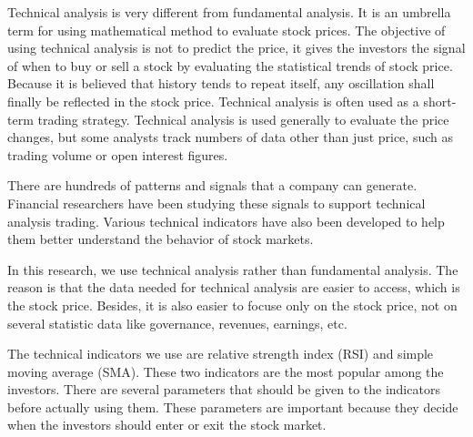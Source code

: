 \documentclass[../main.tex]{subfiles}
\begin{document}
\bigbreak

Technical analysis is very different from fundamental analysis. It is an umbrella term for using mathematical method to evaluate stock prices. The objective of using technical analysis is not to predict the price, it gives the investors the signal of when to buy or sell a stock by evaluating the statistical trends of stock price. Because it is believed that history tends to repeat itself, any oscillation shall finally be reflected in the stock price. Technical analysis is often used as a short-term trading strategy. Technical analysis is used generally to evaluate the price changes, but some analysts track numbers of data other than just price, such as trading volume or open interest figures.

\bigbreak

There are hundreds of patterns and signals that a company can generate. Financial researchers have been studying these signals to support technical analysis trading. Various technical indicators have also been developed to help them better understand the behavior of stock markets.

\bigbreak



In this research, we use technical analysis rather than fundamental analysis. The reason is that the data needed for technical analysis are easier to access, which is the stock price. Besides, it is also easier to focuse only on the stock price, not on several statistic data like governance, revenues, earnings, etc.

\bigbreak

The technical indicators we use are relative strength index (RSI) and simple moving average (SMA). These two indicators are the most popular among the investors. There are several parameters that should be given to the indicators before actually using them. These parameters are important because they decide when the investors should enter or exit the stock market.
\end{document}

